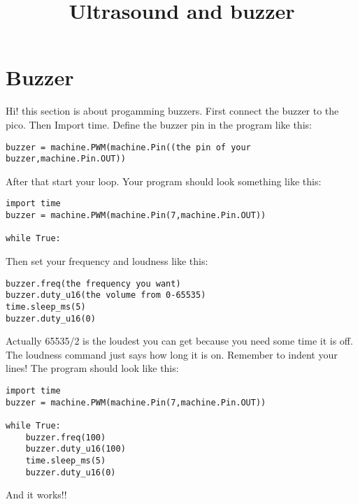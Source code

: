 \documentclass[12pt]{article}
\begin{document}
\title{Ultrasound and buzzer}
\maketitle
\section{Buzzer}
Hi! this section is about progamming buzzers.
First connect the buzzer to the pico.
Then Import time.
Define the buzzer pin in the program like this:
\begin{verbatim}
buzzer = machine.PWM(machine.Pin((the pin of your buzzer,machine.Pin.OUT))
\end{verbatim}
After that start your loop.
Your program should look something like this:
\begin{verbatim}
import time
buzzer = machine.PWM(machine.Pin(7,machine.Pin.OUT))

while True:
\end{verbatim}
Then set your frequency and loudness like this:
\begin{verbatim}
buzzer.freq(the frequency you want)
buzzer.duty_u16(the volume from 0-65535)
time.sleep_ms(5)
buzzer.duty_u16(0)
\end{verbatim}
Actually 65535/2 is the loudest you can get because you need some time it is off.
The loudness command just says how long it is on.
Remember to indent your lines!
The program should look like this:
\begin{verbatim}
import time
buzzer = machine.PWM(machine.Pin(7,machine.Pin.OUT))

while True:
    buzzer.freq(100)
    buzzer.duty_u16(100)
    time.sleep_ms(5)
    buzzer.duty_u16(0)
\end{verbatim}
And it works!!
\end{document}
